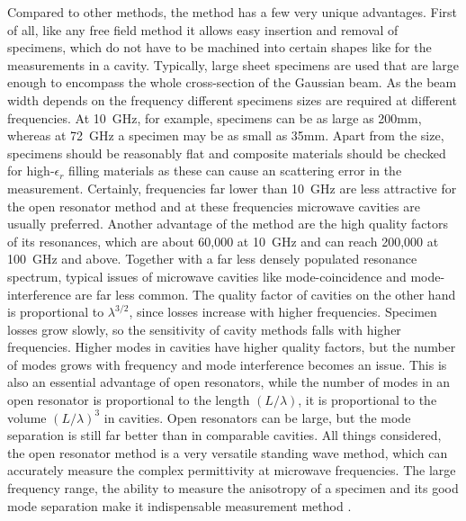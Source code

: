 Compared to other methods, the method has a few very unique advantages. First of all, like any free field method it allows easy insertion and removal of specimens, which do not have to be machined into certain shapes like for the measurements in a cavity. Typically, large sheet specimens are used that are large enough to encompass the whole cross-section of the Gaussian beam. As the beam width depends on the frequency different specimens sizes are required at different frequencies. At \SI{10}{\giga\hertz}, for example, specimens can be as large as 200mm, whereas at \SI{72}{\giga\hertz} a specimen may be as small as 35mm. Apart from the size, specimens should be reasonably flat and composite materials should be checked for high-$\epsilon_r$ filling materials as these can cause an scattering error in the measurement. Certainly, frequencies far lower than \SI{10}{\giga\hertz} are less attractive for the open resonator method and at these frequencies microwave cavities are usually preferred. Another advantage of the method are the high quality factors of its resonances, which are about 60,000 at \SI{10}{\giga\hertz} and can reach 200,000 at \SI{100}{\giga\hertz} and above. Together with a far less densely populated resonance spectrum, typical issues of microwave cavities like mode-coincidence and mode-interference are far less common. The quality factor of cavities on the other hand is proportional to $\lambda^{3/2}$, since losses increase with higher frequencies. Specimen losses grow slowly, so the sensitivity of cavity methods falls with higher frequencies. Higher modes in cavities have higher quality factors, but the number of modes grows with frequency and mode interference becomes an issue. This is also an essential advantage of open resonators, while the number of modes in an open resonator is proportional to the length $(L/\lambda)$, it is proportional to the volume $(L/\lambda)^3$ in cavities. Open resonators can be large, but the mode separation is still far better than in comparable cavities. All things considered, the open resonator method is a very versatile standing wave method, which can accurately measure the complex permittivity at microwave frequencies. The large frequency range, the ability to measure the anisotropy of a specimen and its good mode separation make it indispensable measurement method \cite{NPL,chen}.


 
